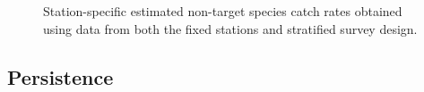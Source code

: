\documentclass[12pt]{article}\usepackage[]{graphicx}\usepackage[]{color}
\begin{document}
\begin{figure}[htb]

{\centering {} 

}

\caption{Station-specific estimated non-target species catch rates obtained using data from both the fixed stations and stratified survey design.}\label{fig:non-target-spat}
\end{figure}
\hypertarget{persistence}{%
\subsection{Persistence}\label{persistence}}
\end{document}
